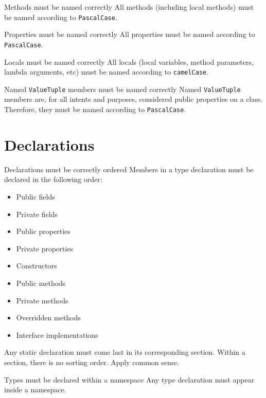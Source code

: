 \documentclass[11pt,a4paper]{article}
\begin{document}
\begin{must}{Methods must be named correctly}
All methods (including local methods) must be named according to \texttt{PascalCase}.
\end{must}

\begin{must}{Properties must be named correctly}
All properties must be named according to \texttt{PascalCase}.
\end{must}

\begin{must}{Locals must be named correctly}
All locals (local variables, method parameters, lambda arguments, etc) must be named according to \texttt{camelCase}.
\end{must}

\begin{must}{Named \texttt{ValueTuple} members must be named correctly}
Named \texttt{ValueTuple} members are, for all intents and purposes, considered public properties on a class. Therefore, they must be named according to \texttt{PascalCase}.
\end{must}

\section{Declarations}
\begin{must}{Declarations must be correctly ordered}
Members in a type declaration must be declared in the following order:
\begin{itemize}
\item Public fields
\item Private fields
\item Public properties
\item Private properties
\item Constructors
\item Public methods
\item Private methods
\item Overridden methods
\item Interface implementations
\end{itemize}

Any static declaration must come last in its corresponding section. Within a section, there is no sorting order. Apply common sense.
\end{must}

\begin{must}{Types must be declared within a namespace}
Any type declaration must appear inside a namespace.
\end{must}
\end{document}
